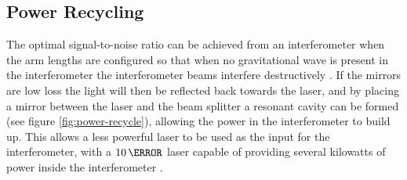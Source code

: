 \documentclass{kentigern}
\begin{document}
\subsection{Power Recycling}
\label{sec:power-recycling}
%
%
The optimal signal-to-noise ratio can be achieved from an
interferometer when the arm lengths are configured so that when no
gravitational wave is present in the interferometer the interferometer
beams interfere destructively \cite{1978JPhE...11..710E}. If the
mirrors are low loss the light will then be reflected back towards the
laser, and by placing a mirror between the laser and the beam splitter
a resonant cavity can be formed (see figure \ref{fig:power-recycle}),
allowing the power in the interferometer to build up. This allows a
less powerful laser to be used as the input for the interferometer,
with a $10\,\watt$ laser capable of providing several kilowatts of
power inside the interferometer \cite{2011LRR....14....5P}.
\end{document}
